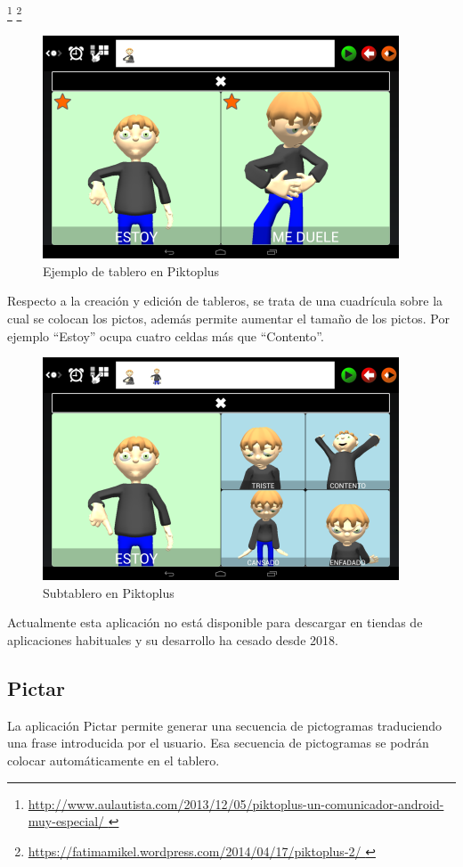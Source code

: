 \footnote{\url{http://www.aulautista.com/2013/12/05/piktoplus-un-comunicador-android-muy-especial/ }} \footnote{\url{https://fatimamikel.wordpress.com/2014/04/17/piktoplus-2/ }}
\begin{figure}[h!]
	\centering
	\includegraphics[width=0.7\linewidth]{Imagenes/Bitmap/Piktoplus1}
	\caption[Pictoplus tablero]{Ejemplo de tablero en Piktoplus}
	\label{fig:piktoplus1}
\end{figure}



Respecto a la creación y edición de tableros, se trata de una cuadrícula sobre la cual se colocan los pictos, además permite aumentar el tamaño de los pictos. Por ejemplo “Estoy” ocupa cuatro celdas más que “Contento”.

\begin{figure}[h!]
	\centering
	\includegraphics[width=0.7\linewidth]{Imagenes/Bitmap/Piktoplus2}
	\caption[Subtablero Piktoplus]{Subtablero en Piktoplus}
	\label{fig:piktoplus2}
\end{figure}


Actualmente esta aplicación no está disponible para descargar en tiendas de aplicaciones  habituales y su desarrollo ha cesado desde 2018.

\subsection{Pictar}
La aplicación Pictar permite generar una secuencia de pictogramas traduciendo una frase introducida por el usuario. Esa secuencia de pictogramas se podrán colocar automáticamente en el tablero.


